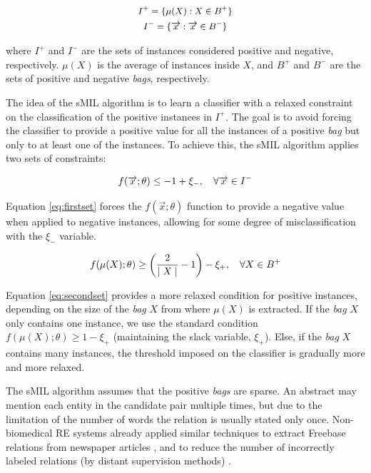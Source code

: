 \begin{equation} \label{eq:negativeinstances}
\small
\begin{gathered}
I^+ = \{\mu(X) : X \in B^+\} \\
I^- = \{\overrightarrow{x} : \overrightarrow{x} \in B^-\}
\end{gathered}
\end{equation}

where $I^+$ and $I^-$ are the sets of instances considered positive and negative, respectively. $\mu(X)$ is the average of instances inside $X$, and $B^+$ and $B^-$ are the sets of positive and negative \textit{bags}, respectively.

The idea of the sMIL algorithm is to learn a classifier with a relaxed constraint on the classification of the positive instances in $I^+$. The goal is to avoid forcing the classifier to provide a positive value for all the instances of a positive \textit{bag} but only to at least one of the instances. To achieve this, the sMIL algorithm applies two sets of constraints:

\begin{equation} \label{eq:firstset}
\small
f(\overrightarrow{x};\theta) \leq -1 + \xi_-, \quad \forall \overrightarrow{x} \in I^-
\end{equation}

Equation \ref{eq:firstset} forces the $f(\overrightarrow{x};\theta)$ function to provide a negative value when applied to negative instances, allowing for some degree of misclassification with the $\xi_-$ variable. 

\begin{equation} \label{eq:secondset}
\small
f(\mu(X);\theta) \geq \bigg(\frac{2}{\mid X \mid} -1\bigg) - \xi_+, \quad \forall X \in B^+
\end{equation}

Equation \ref{eq:secondset} provides a more relaxed condition for positive instances, depending on the size of the \textit{bag} $X$ from where $\mu(X)$ is extracted. If the \textit{bag} $X$ only contains one instance, we use the standard condition $f(\mu(X);\theta) \geq  1 - \xi_+$ (maintaining the slack variable, $\xi_+$). Else, if the \textit{bag} $X$ contains many instances, the threshold imposed on the classifier is gradually more and more relaxed. 

The sMIL algorithm assumes that the positive \textit{bags} are sparse. An abstract may mention each entity in the candidate pair multiple times, but due to the limitation of the number of words the relation is usually stated only once. Non-biomedical RE systems already applied similar techniques to extract Freebase relations from newspaper articles \citep{10.1007/978-3-642-15939-8_10}, and to reduce the number of incorrectly labeled relations (by distant supervision methods) \citep{min-etal-2013-distant}.

